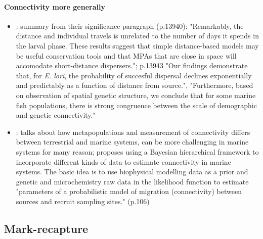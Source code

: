 \documentclass[12pt, oneside]{article}   	%
\begin{document}
\paragraph*{Connectivity more generally}
\begin{itemize}
\item \cite{d2015patterns}: summary from their significance paragraph (p.13940): "Remarkably, the distance and individual travels is unrelated to the number of days it spends in the larval phase. These results suggest that simple distance-based models may be useful conservation tools and that MPAs that are close in space will accomodate short-distance dispersers."; p.13943 "Our findings demonstrate that, for \textit{E. lori}, the probability of succesful dispersal declines exponentially and predictably as a function of distance from source.", "Furthermore, based on observation of spatial genetic structure, we conclude that for some marine fish populations, there is strong congruence between the scale of demographic and genetic connectivity."
\item \cite{gaggiotti2017metapopulations}: talks about how metapopulations and measurement of connectivity differs between terrestrial and marine systems, can be more challenging in marine systems for many reason; proposes using a Bayesian hierarchical framework to incorporate different kinds of data to estimate connectivity in marine systems. The basic idea is to use biophysical modelling data as a prior and genetic and microchemistry raw data in the likelihood function to estimate "parameters of a probabilistic model of migration (connectivity) between sources and recruit sampling sites." (p.106)
\end{itemize}

\subsection*{Mark-recapture}
\end{document}
